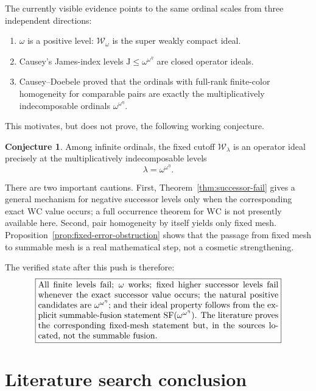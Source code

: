 \documentclass[11pt]{article}
\theoremstyle{definition}
\newtheorem{conjecture}[theorem]{Conjecture}
\theoremstyle{remark}
\newcommand{\WC}{\mathrm{WC}}
\newcommand{\J}{\mathrm{J}}
\newcommand{\cW}{\mathcal W}
\begin{document}
The currently visible evidence points to the same ordinal scales from three independent directions:
\begin{enumerate}[label=\textup{(\arabic*)}]
\item $\omega$ is a positive level: $\cW_\omega$ is the super weakly compact ideal.
\item Causey's James-index levels $\J\leq\omega^{\omega^\eta}$ are closed operator ideals.
\item Causey--Doebele proved that the ordinals with full-rank finite-color homogeneity for comparable pairs are exactly the multiplicatively indecomposable ordinals $\omega^{\omega^\eta}$.
\end{enumerate}

This motivates, but does not prove, the following working conjecture.

\begin{conjecture}\label{conj:classification}
Among infinite ordinals, the fixed cutoff $\cW_\lambda$ is an operator ideal precisely at the multiplicatively indecomposable levels
\[
   \lambda=\omega^{\omega^\eta}.
\]
\end{conjecture}

There are two important cautions.
First, Theorem~\ref{thm:successor-fail} gives a general mechanism for negative successor levels only when the corresponding exact $\WC$ value occurs; a full occurrence theorem for $\WC$ is not presently available here.
Second, pair homogeneity by itself yields only fixed mesh.  Proposition~\ref{prop:fixed-error-obstruction} shows that the passage from fixed mesh to summable mesh is a real mathematical step, not a cosmetic strengthening.

The verified state after this push is therefore:
\[
\boxed{
\begin{minipage}{0.82\textwidth}
All finite levels fail; $\omega$ works; fixed higher successor levels fail whenever the exact successor value occurs; the natural positive candidates are $\omega^{\omega^\eta}$; and their ideal property follows from the explicit summable-fusion statement $\mathrm{SF}(\omega^{\omega^\eta})$.  The literature proves the corresponding fixed-mesh statement but, in the sources located, not the summable fusion.
\end{minipage}}
\]

\section{Literature search conclusion}
\end{document}
